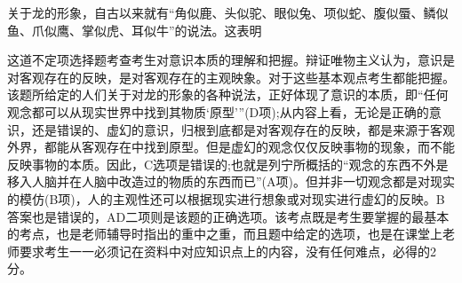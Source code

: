 \question 关于龙的形象，自古以来就有``角似鹿、头似驼、眼似兔、项似蛇、腹似蜃、鳞似鱼、爪似鹰、掌似虎、耳似牛''的说法。这表明
\par{}
\begin{solution}这道不定项选择题考查考生对意识本质的理解和把握。辩证唯物主义认为，意识是对客观存在的反映，是对客观存在的主观映象。对于这些基本观点考生都能把握。该题所给定的人们关于对龙的形象的各种说法，正好体现了意识的本质，即``任何观念都可以从现实世界中找到其物质`原型'''(D项);从内容上看，无论是正确的意识，还是错误的、虚幻的意识，归根到底都是对客观存在的反映，都是来源于客观外界，都能从客观存在中找到原型。但是虚幻的观念仅仅反映事物的现象，而不能反映事物的本质。因此，C选项是错误的;也就是列宁所概括的``观念的东西不外是移入人脑并在人脑中改造过的物质的东西而已''(A项)。但并非一切观念都是对现实的模仿(B项)，人的主观性还可以根据现实进行想象或对现实进行虚幻的反映。B答案也是错误的，AD二项则是该题的正确选项。该考点既是考生要掌握的最基本的考点，也是老师辅导时指出的重中之重，而且题中给定的选项，也是在课堂上老师要求考生一一必须记在资料中对应知识点上的内容，没有任何难点，必得的2分。
\end{solution}
